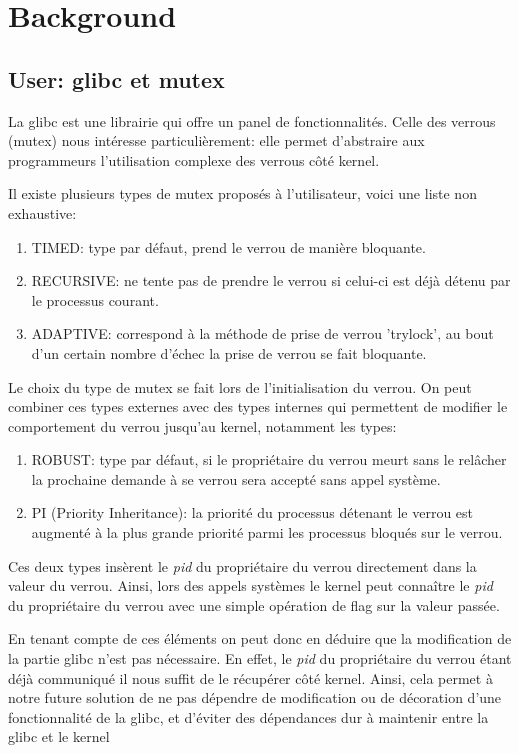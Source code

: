 \section{Background}

\subsection{User: glibc et mutex}
La glibc est une librairie qui offre un panel de fonctionnalités. 
Celle des verrous (mutex) nous intéresse particulièrement: elle permet 
d'abstraire aux programmeurs l'utilisation complexe des verrous côté kernel.

Il existe plusieurs types de mutex proposés à l'utilisateur, voici une liste non exhaustive:
\begin{enumerate}
	\item TIMED: type par défaut, prend le verrou de manière bloquante.
	\item RECURSIVE: ne tente pas de prendre le verrou si celui-ci est
	déjà détenu par le processus courant.
	\item ADAPTIVE: correspond à la méthode de prise de verrou 'trylock',
	au bout d'un certain nombre d'échec la prise de verrou se fait
	bloquante.
\end{enumerate}
Le choix du type de mutex se fait lors de l'initialisation du verrou.
On peut combiner ces types externes avec des types internes qui permettent de
modifier le comportement du verrou jusqu'au kernel, notamment les types:

\begin{enumerate}
	\item ROBUST: type par défaut, si le propriétaire du verrou meurt sans
	le relâcher la prochaine demande à se verrou sera accepté sans appel
	système.
	\item PI (Priority Inheritance): la priorité du processus détenant le
	verrou est augmenté à la plus grande priorité parmi les processus
	bloqués sur le verrou.
\end{enumerate}
Ces deux types insèrent le \textit{pid} du propriétaire du verrou
directement dans la valeur du verrou. Ainsi, lors des appels systèmes le kernel
peut connaître le \textit{pid} du propriétaire du verrou avec une simple
opération de flag sur la valeur passée.

En tenant compte de ces éléments on peut donc en déduire que la modification 
de la partie glibc n'est pas nécessaire. En effet, le \textit{pid} du 
propriétaire du verrou étant déjà communiqué il nous suffit de le récupérer 
côté kernel. Ainsi, cela permet à notre future solution de ne pas dépendre de 
modification ou de décoration d'une fonctionnalité de la glibc, et d'éviter
des dépendances dur à maintenir entre la glibc et le kernel

